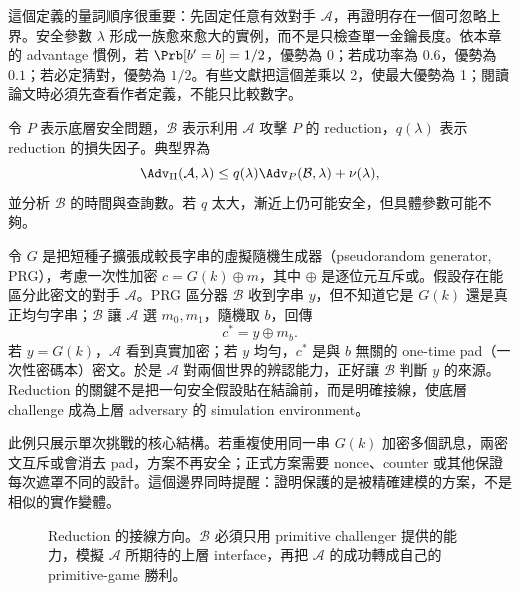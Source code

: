 \documentclass[11pt,a4paper,oneside,openany]{book}
\begin{document}
這個定義的量詞順序很重要：先固定任意有效對手 $\mathcal A$，再證明存在一個可忽略上界。安全參數 $\lambda$ 形成一族愈來愈大的實例，而不是只檢查單一金鑰長度。依本章的 advantage 慣例，若 $\Prb[b'=b]=1/2$，優勢為 0；若成功率為 $0.6$，優勢為 $0.1$；若必定猜對，優勢為 $1/2$。有些文獻把這個差乘以 2，使最大優勢為 1；閱讀論文時必須先查看作者定義，不能只比較數字。

令 $P$ 表示底層安全問題，$\mathcal B$ 表示利用 $\mathcal A$ 攻擊 $P$ 的 reduction，$q(\lambda)$ 表示 reduction 的損失因子。典型界為
\[
 \Adv_{\Pi}(\mathcal A,\lambda)
 \le q(\lambda)\Adv_{P}(\mathcal B,\lambda)+\nu(\lambda),
\]
並分析 $\mathcal B$ 的時間與查詢數。若 $q$ 太大，漸近上仍可能安全，但具體參數可能不夠。

\begin{example}
令 $G$ 是把短種子擴張成較長字串的虛擬隨機生成器（pseudorandom generator, PRG），考慮一次性加密 $c=G(k)\oplus m$，其中 $\oplus$ 是逐位元互斥或。假設存在能區分此密文的對手 $\mathcal A$。PRG 區分器 $\mathcal B$ 收到字串 $y$，但不知道它是 $G(k)$ 還是真正均勻字串；$\mathcal B$ 讓 $\mathcal A$ 選 $m_0,m_1$，隨機取 $b$，回傳
\[
 c^*=y\oplus m_b.
\]
若 $y=G(k)$，$\mathcal A$ 看到真實加密；若 $y$ 均勻，$c^*$ 是與 $b$ 無關的 one-time pad（一次性密碼本）密文。於是 $\mathcal A$ 對兩個世界的辨認能力，正好讓 $\mathcal B$ 判斷 $y$ 的來源。Reduction 的關鍵不是把一句安全假設貼在結論前，而是明確接線，使底層 challenge 成為上層 adversary 的 simulation environment。

此例只展示單次挑戰的核心結構。若重複使用同一串 $G(k)$ 加密多個訊息，兩密文互斥或會消去 pad，方案不再安全；正式方案需要 nonce、counter 或其他保證每次遮罩不同的設計。這個邊界同時提醒：證明保護的是被精確建模的方案，不是相似的實作變體。
\end{example}

\begin{figure}[htbp]
\centering
{}
\caption{Reduction 的接線方向。$\mathcal B$ 必須只用 primitive challenger 提供的能力，模擬 $\mathcal A$ 所期待的上層 interface，再把 $\mathcal A$ 的成功轉成自己的 primitive-game 勝利。}
\label{fig:security-reduction-wiring}
\end{figure}
\end{document}
